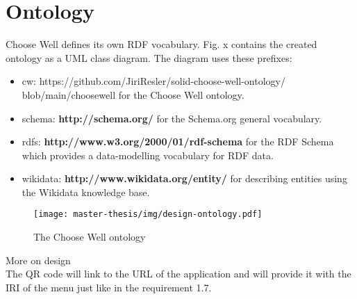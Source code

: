 \section{Ontology}
Choose Well defines its own RDF vocabulary. 
Fig. x contains the created ontology as a UML class diagram. 
The diagram uses these prefixes:
\begin{itemize}[noitemsep,nolistsep]
  \item cw: https://github.com/JiriResler/solid-choose-well-ontology/ \newline blob/main/choosewell for the Choose Well ontology.
  \item schema: \textbf{http://schema.org/} for the Schema.org general vocabulary. 
  \item rdfs: \textbf{http://www.w3.org/2000/01/rdf-schema} for the RDF Schema which provides a data-modelling vocabulary for RDF data.
  \item wikidata: \textbf{http://www.wikidata.org/entity/} for describing entities using the Wikidata knowledge base.
\end{itemize}

\begin{figure}[h]
  \centering
  \texttt{[image: master-thesis/img/design-ontology.pdf]}
  \caption{The Choose Well ontology}
\end{figure}

More on design \\
The QR code will link to the URL of the application and will provide it with the IRI of the menu just like in the requirement 1.7.